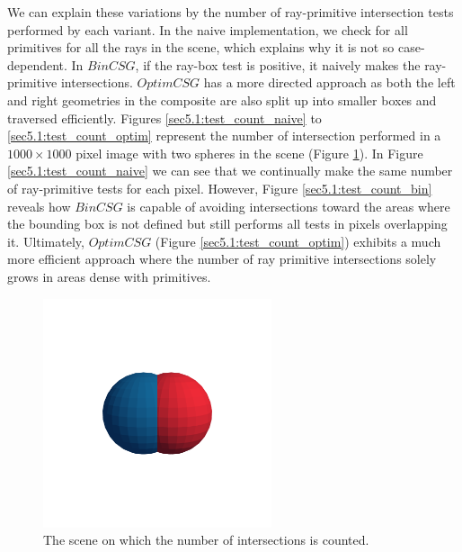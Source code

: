 \documentclass[a4paper,11pt,oneside]{article}
\begin{document}
We can explain these variations by the number of ray-primitive intersection tests performed by each variant. In the naive implementation, we check for all primitives for all the rays in the scene, which explains why it is not so case-dependent. In $BinCSG$, if the ray-box test is positive, it naively makes the ray-primitive intersections. $OptimCSG$ has a more directed approach as both the left and right geometries in the composite are also split up into smaller boxes and traversed efficiently. Figures \ref{sec5.1:test_count_naive} to \ref{sec5.1:test_count_optim} represent the number of intersection performed in a $1000 \times 1000$ pixel image with two spheres in the scene (Figure \ref{sec5.1:test_count_render}). In Figure \ref{sec5.1:test_count_naive} we can see that we continually make the same number of ray-primitive tests for each pixel. However, Figure \ref{sec5.1:test_count_bin} reveals how $BinCSG$ is capable of avoiding intersections toward the areas where the bounding box is not defined but still performs all tests in pixels overlapping it. Ultimately, $OptimCSG$ (Figure \ref{sec5.1:test_count_optim}) exhibits a much more efficient approach where the number of ray primitive intersections solely grows in areas dense with primitives.

\begin{figure}[H]
	\centering
	\includegraphics[width=0.6\textwidth]{section5/plots/union.png}
	\caption{The scene on which the number of intersections is counted.}
	\label{sec5.1:test_count_render}
\end{figure}
\end{document}
